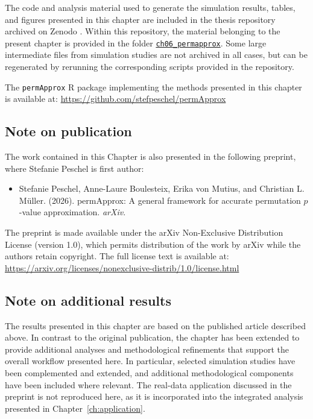 The code and analysis material used to generate the simulation results, tables, and figures presented in this chapter are included in the thesis repository archived on Zenodo \citep{Peschel2026thesisRepo}. Within this repository, the material belonging to the present chapter is provided in the folder \href{https://github.com/stefpeschel/phd_thesis/tree/main/ch06_permapprox}{\texttt{ch06\_permapprox}}. Some large intermediate files from simulation studies are not archived in all cases, but can be regenerated by rerunning the corresponding scripts provided in the repository.

The \texttt{permApprox} R package implementing the methods presented in this chapter is available at: \url{https://github.com/stefpeschel/permApprox}

\subsection*{Note on publication}

The work contained in this Chapter is also presented in the following preprint, where Stefanie Peschel is first author:

\begin{itemize}
\item Stefanie Peschel, Anne-Laure Boulesteix, Erika von Mutius, and Christian L. Müller. (2026). permApprox: A general framework for accurate permutation $p$-value approximation. \textit{arXiv}.
\end{itemize}

The preprint is made available under the arXiv Non-Exclusive Distribution License (version 1.0), which permits distribution of the work by arXiv while the authors retain copyright. The full license text is available at:\\
\url{https://arxiv.org/licenses/nonexclusive-distrib/1.0/license.html}

\subsection*{Note on additional results}

The results presented in this chapter are based on the published article described above. In contrast to the original publication, the chapter has been extended to provide additional analyses and methodological refinements that support the overall workflow presented here. 
In particular, selected simulation studies have been complemented and extended, and additional methodological components have been included where relevant. The real-data application discussed in the preprint is not reproduced here, as it is incorporated into the integrated analysis presented in Chapter~\ref{ch:application}.

